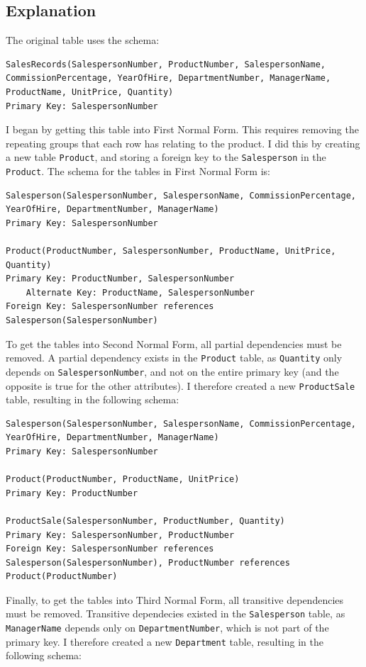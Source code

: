 \documentclass{article}
\begin{document}
\subsection{Explanation}
The original table uses the schema:
\begin{lstlisting}
SalesRecords(SalespersonNumber, ProductNumber, SalespersonName, CommissionPercentage, YearOfHire, DepartmentNumber, ManagerName, ProductName, UnitPrice, Quantity)
Primary Key: SalespersonNumber
\end{lstlisting}
I began by getting this table into First Normal Form. This requires removing the repeating groups that each row has relating to the product. I did this by creating a new table \texttt{Product}, and storing a foreign key to the \texttt{Salesperson} in the \texttt{Product}. The schema for the tables in First Normal Form is:
\begin{lstlisting}
Salesperson(SalespersonNumber, SalespersonName, CommissionPercentage, YearOfHire, DepartmentNumber, ManagerName)
Primary Key: SalespersonNumber

Product(ProductNumber, SalespersonNumber, ProductName, UnitPrice, Quantity)
Primary Key: ProductNumber, SalespersonNumber
    Alternate Key: ProductName, SalespersonNumber
Foreign Key: SalespersonNumber references Salesperson(SalespersonNumber)
\end{lstlisting}
To get the tables into Second Normal Form, all partial dependencies must be removed. A partial dependency exists in the \texttt{Product} table, as \texttt{Quantity} only depends on \texttt{SalespersonNumber}, and not on the entire primary key (and the opposite is true for the other attributes). I therefore created a new \texttt{ProductSale} table, resulting in the following schema:
\begin{lstlisting}
Salesperson(SalespersonNumber, SalespersonName, CommissionPercentage, YearOfHire, DepartmentNumber, ManagerName)
Primary Key: SalespersonNumber

Product(ProductNumber, ProductName, UnitPrice)
Primary Key: ProductNumber

ProductSale(SalespersonNumber, ProductNumber, Quantity)
Primary Key: SalespersonNumber, ProductNumber
Foreign Key: SalespersonNumber references Salesperson(SalespersonNumber), ProductNumber references Product(ProductNumber)
\end{lstlisting}
Finally, to get the tables into Third Normal Form, all transitive dependencies must be removed. Transitive dependecies existed in the \texttt{Salesperson} table, as \texttt{ManagerName} depends only on \texttt{DepartmentNumber}, which is not part of the primary key. I therefore created a new \texttt{Department} table, resulting in the following schema:
\end{document}
